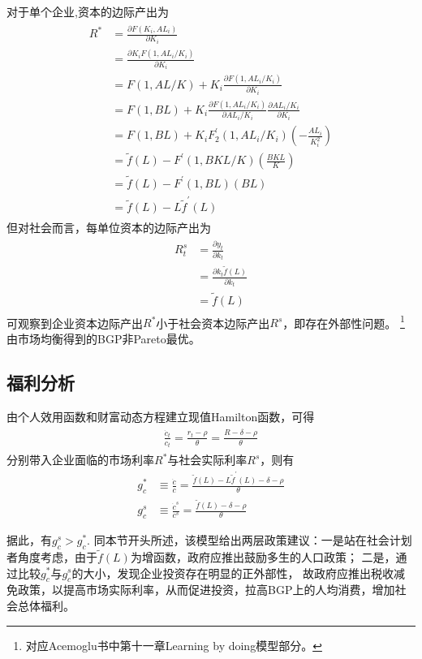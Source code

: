 \documentclass[cn,normal,11pt,black]{elegantnote}
\begin{document}
\begin{corollary}
    对于单个企业,资本的边际产出为
    \begin{align}
    \begin{aligned}
        R^* & = \frac{\partial F(K_i,AL_i)}{\partial K_i} \\
          & = \frac{\partial K_i F(1,A L_i/K_i)}{\partial K_i} \\
          & = F(1, A L/K) + K_i \frac{\partial F(1,AL_i/K_i)}{\partial K_i} \\
          & = F(1, BL) + K_i \frac{\partial F(1,AL_i/K_i)}{\partial AL_i/K_i} \frac{\partial AL_i/K_i}{\partial K_i} \\
          & = F(1, BL) + K_i F_2^\prime(1,AL_i/K_i)(- \frac{AL_i}{K_i^2}) \\
          & = \tilde f(L) - F^\prime(1,BKL/K)(\frac{BKL}{K}) \\
          & = \tilde f(L) - F^\prime(1,BL)(BL) \\
          & = \tilde f(L) - L\tilde f^\prime(L)
    \end{aligned}
    \end{align}
    但对社会而言，每单位资本的边际产出为
    \begin{align}
    \begin{aligned}
        R^{s}_t & = \frac{\partial y_t}{\partial k_t}  \\
          & = \frac{\partial k_t \tilde f(L)}{\partial k_t}  \\
          & = \tilde f(L)
    \end{aligned}
    \end{align}
    可观察到企业资本边际产出$R^*$小于社会资本边际产出$R^s$，即存在外部性问题。
    \footnote{对应Acemoglu书中第十一章Learning by doing模型部分。}
    由市场均衡得到的BGP非Pareto最优。

    \subsection{福利分析}
    由个人效用函数和财富动态方程建立现值Hamilton函数，可得
    \begin{align}
    \begin{aligned}
    \frac{\dot{c}_t}{c_t} = \frac{r_t -  \rho}{\theta}  = \frac{R - \delta -  \rho}{\theta}
    \end{aligned}
    \end{align}
    分别带入企业面临的市场利率$R^*$与社会实际利率$R^s$，则有
    \begin{align}
        g_c^* & \equiv \frac{\dot{c}}{c} = \frac{ \tilde f(L) - L\tilde f^\prime(L) -\delta - \rho}{\theta} \\
        g_c^s & \equiv \frac{\dot{c}^s}{c^s} = \frac{ \tilde f(L) -\delta - \rho}{\theta}
    \end{align}

    据此，有$g_c^s > g_c^*$.
    同本节开头所述，该模型给出两层政策建议：一是站在社会计划者角度考虑，由于$\tilde{f}(L)$为增函数，政府应推出鼓励多生的人口政策；
    二是，通过比较$g^*_c$与$g^s_c$的大小，发现企业投资存在明显的正外部性，
    故政府应推出税收减免政策，以提高市场实际利率，从而促进投资，拉高BGP上的人均消费，增加社会总体福利。
\end{corollary}
\end{document}
